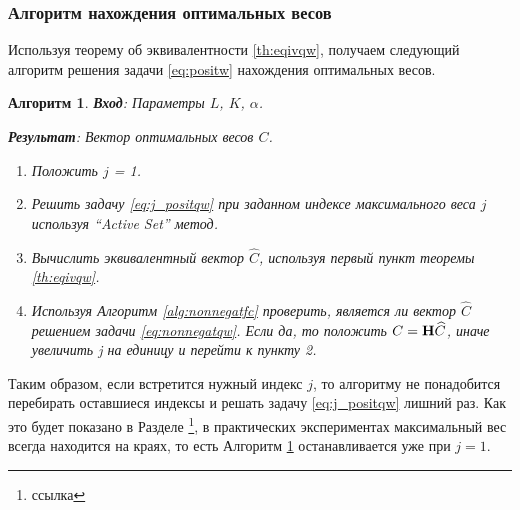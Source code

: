 \documentclass[12pt,a4paper]{article}
\newtheorem{algorithm}{Алгоритм}
\begin{document}
\subsubsection{Алгоритм нахождения оптимальных весов}
Используя теорему об эквивалентности \ref{th:eqivqw}, получаем следующий алгоритм решения задачи \eqref{eq:positw} нахождения оптимальных весов.
\begin{algorithm}
	\label{alg:solveqw}
	\textbf{Вход}: Параметры $L$, $K$, $\alpha$.
	
	\textbf{Результат}:
	Вектор оптимальных весов $C$.
	
	\begin{enumerate}
		\item Положить $j$ = 1.
		\item Решить задачу \eqref{eq:j_positqw} при заданном индексе максимального веса $j$ используя ``Active Set'' метод.
		\item Вычислить эквивалентный вектор $\widehat C$, используя первый пункт теоремы \ref{th:eqivqw}.
		\item Используя Алгоритм \ref{alg:nonnegatfc} проверить, является ли вектор $\widehat C$ решением задачи \eqref{eq:nonnegatqw}. Если да, то положить $C = \mathbf{H} \widehat C$, иначе увеличить j на единицу и перейти к пункту 2.
	\end{enumerate}
\end{algorithm}

Таким образом, если встретится нужный индекс $j$, то алгоритму не понадобится перебирать оставшиеся индексы и решать задачу \eqref{eq:j_positqw} лишний раз. Как это будет показано в Разделе \footnote{ссылка}, в практических экспериментах максимальный вес всегда находится на краях, то есть Алгоритм \ref{alg:solveqw} останавливается уже при $j = 1$.
\end{document}
